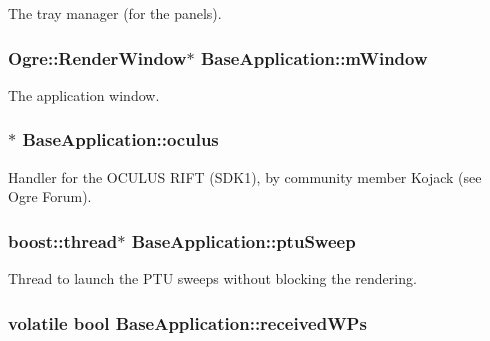 \-The tray manager (for the panels). \hypertarget{classBaseApplication_ac5d8e9c81e036897bc82f81eff8c570f}{
\subsubsection[{m\-Window}]{\setlength{\rightskip}{0pt plus 5cm}\-Ogre\-::\-Render\-Window$\ast$ {\bf \-Base\-Application\-::m\-Window}}}\label{classBaseApplication_ac5d8e9c81e036897bc82f81eff8c570f}
\-The application window. \hypertarget{classBaseApplication_a2edad3c6709f1ff6af45350308a62c8f}{
\subsubsection[{oculus}]{$\ast$ {\bf \-Base\-Application\-::oculus}}}\label{classBaseApplication_a2edad3c6709f1ff6af45350308a62c8f}
\-Handler for the \-O\-C\-U\-L\-U\-S \-R\-I\-F\-T (\-S\-D\-K1), by community member \-Kojack (see \-Ogre \-Forum). \hypertarget{classBaseApplication_ac9c68350fd4e5888c3256a77db02278e}{
\subsubsection[{ptu\-Sweep}]{\setlength{\rightskip}{0pt plus 5cm}boost\-::thread$\ast$ {\bf \-Base\-Application\-::ptu\-Sweep}}}\label{classBaseApplication_ac9c68350fd4e5888c3256a77db02278e}
\-Thread to launch the \-P\-T\-U sweeps without blocking the rendering. \hypertarget{classBaseApplication_a37fa2d6256de90b4babeee56bcd143d4}{
\subsubsection[{received\-W\-Ps}]{\setlength{\rightskip}{0pt plus 5cm}volatile bool {\bf \-Base\-Application\-::received\-W\-Ps}}}\label{classBaseApplication_a37fa2d6256de90b4babeee56bcd143d4}
